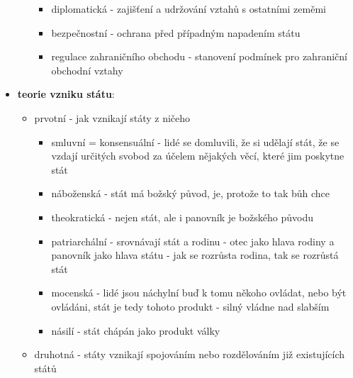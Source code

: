 \documentclass{article}
\begin{document}
\begin{itemize}
\begin{itemize}
    \begin{itemize}
      \item diplomatická - zajišťení a udržování vztahů s ostatními zeměmi
      \item bezpečnostní - ochrana před případným napadením státu
      \item regulace zahraničního obchodu - stanovení podmínek pro zahraniční obchodní vztahy
    \end{itemize}
  \end{itemize}
  \item \textbf{teorie vzniku státu}:
  \begin{itemize}
    \item prvotní - jak vznikají státy z ničeho
    \begin{itemize}
      \item smluvní = konsensuální - lidé se domluvili, že si udělají stát, že se vzdají určitých svobod za účelem nějakých věcí, které jim poskytne stát
      \item náboženská - stát má božský původ, je, protože to tak bůh chce
      \item theokratická - nejen stát, ale i panovník je božského původu
      \item patriarchální - srovnávají stát a rodinu - otec jako hlava rodiny a panovník jako hlava státu - jak se rozrůsta rodina, tak se rozrůstá stát
      \item mocenská - lidé jsou náchylní buď k tomu někoho ovládat, nebo být ovládáni, stát je tedy tohoto produkt - silný vládne nad slabším
      \item násilí - stát chápán jako produkt války
    \end{itemize}
    \item druhotná - státy vznikají spojováním nebo rozdělováním již existujících států
  \end{itemize}
\end{itemize}
\end{document}
